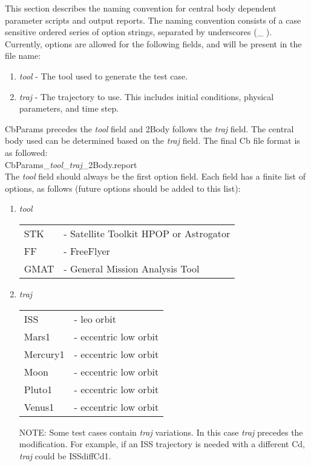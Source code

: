 This section describes the naming convention for central body
dependent parameter scripts and output reports. The naming
convention consists of a case sensitive ordered series of option
strings, separated by underscores (\_ ). Currently, options are
allowed for the following fields, and will be present in the file
name:
\begin{enumerate}
  \item \emph{tool} - The tool used to generate the test case.
  \item \emph{traj} - The trajectory to use.  This includes initial conditions, physical parameters, and time
  step.
\end{enumerate}

CbParams precedes the \emph{tool} field and 2Body follows the
\emph{traj} field. The central body used can be determined based on
the \emph{traj} field. The final Cb file format is as followed:\\
CbParams\_\emph{tool}\_\emph{traj}\_2Body.report\\

The \emph{tool} field should always be the first option field. Each
field has a finite list of options, as follows (future options
should be added to this list):
\begin{enumerate}
  \item \emph{tool}\\
  \begin{tabular}{ll}
    STK  & - Satellite Toolkit HPOP or Astrogator\\
    FF   & - FreeFlyer\\
    GMAT & - General Mission Analysis Tool\\
  \end{tabular}

  \item \emph{traj}\\
  \begin{tabular}{ll}
    ISS & - leo orbit\\
    Mars1 & - eccentric low orbit\\
    Mercury1 & - eccentric low orbit\\
    Moon & - eccentric low orbit\\
    Pluto1 & - eccentric low orbit\\
    Venus1 & - eccentric low orbit\\
  \end{tabular}

NOTE:  Some test cases contain \emph{traj} variations. In this case
\emph{traj} precedes the modification. For example, if an ISS
trajectory is needed with a different Cd, \emph{traj} could be
ISSdiffCd1.

\end{enumerate}
